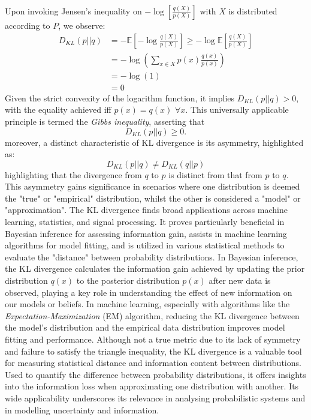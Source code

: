\documentclass[journal,12pt,onecolumn,draftclsnofoot,]{IEEEtran}
\begin{document}
	Upon invoking Jensen's inequality on \(-\log\left[\frac{q(X)}{p(X)} \right]\) with \(X\) is distributed according to \(P\), we observe:
	\begin{align}
		D_{KL}(p||q) & = - \mathbb{E} \left[-\log\frac{q(X)}{p(X)} \right] \geq -\log  \mathbb{E}  \left[\frac{q(X)}{p(X)} \right] \\
		& = - \log \left(  \sum_{x \in X}  p(x) \frac{q(x)}{p(x)}\right) \\
		& = - \log(1) \\
		& = 0
	\end{align}
	Given the strict convexity of the logarithm function, it implies \(D_{KL}(p||q) > 0\), with the equality achieved iff \(p(x) = q(x)\) \( \forall x\). This universally applicable principle is termed the \emph{Gibbs inequality}, asserting that
	\[ D_{KL}(p||q) \geq 0. \]
	moreover, a distinct characteristic of KL divergence is its asymmetry, highlighted as:
	\begin{equation}
		D_{KL}(p||q) \neq D_{KL}(q||p)
	\end{equation}
	highlighting that the divergence from \(q\) to \(p\) is distinct from that from \(p\) to \(q\). This asymmetry gains significance in scenarios where one distribution is deemed the "true" or "empirical" distribution, whilst the other is considered a "model" or "approximation". The KL divergence finds broad applications across machine learning, statistics, and signal processing. It proves particularly beneficial in Bayesian inference for assessing information gain, assists in machine learning algorithms for model fitting, and is utilized in various statistical methods to evaluate the "distance" between probability distributions. In Bayesian inference, the KL divergence calculates the information gain achieved by updating the prior distribution \(q(x)\) to the posterior distribution \(p(x)\) after new data is observed, playing a key role in understanding the effect of new information on our models or beliefs. In machine learning, especially with algorithms like the \emph{Expectation-Maximization} (EM) algorithm, reducing the KL divergence between the model's distribution and the empirical data distribution improves model fitting and performance. Although not a true metric due to its lack of symmetry and failure to satisfy the triangle inequality, the KL divergence is a valuable tool for measuring statistical distance and information content between distributions. Used to quantify the difference between probability distributions, it offers insights into the information loss when approximating one distribution with another. Its wide applicability underscores its relevance in analysing probabilistic systems and in modelling uncertainty and information.
\end{document}
